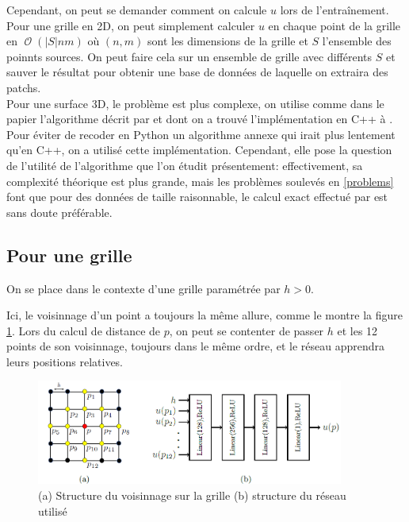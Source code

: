 \documentclass[11pt]{article} %
\DeclareMathOperator\Oo{\mathcal{O}}
\begin{document}
Cependant, on peut se demander comment on calcule $u$ lors de l'entraînement.\\
Pour une grille en 2D, on peut simplement calculer $u$ en chaque point de la grille en $\Oo(\vert S \vert nm)$ où $(n, m)$ sont les dimensions de la grille et $S$ l'ensemble des poinnts sources. On peut faire cela sur un ensemble de grille avec différents $S$ et sauver le résultat pour obtenir une base de données de laquelle on extraira des patchs.\\
Pour une surface 3D, le problème est plus complexe, on utilise comme dans le papier l'algorithme décrit par \cite{ExactGeodesics} et dont on a trouvé l'implémentation en C++ à \cite{ExactGeodesicsCode}. Pour éviter de recoder en Python un algorithme annexe qui irait plus lentement qu'en C++, on a utilisé cette implémentation. Cependant, elle pose la question de l'utilité de l'algorithme que l'on étudit présentement: effectivement, sa complexité théorique est plus grande, mais les problèmes soulevés en \ref{problems} font que pour des données de taille raisonnable, le calcul exact effectué par \cite{ExactGeodesicsCode} est sans doute préférable.

\subsection{Pour une grille}\label{grille}

On se place dans le contexte d'une grille paramétrée par $h > 0$.

Ici, le voisinnage d'un point a toujours la même allure, comme le montre la figure \ref{gridN}. Lors du calcul de distance de $p$, on peut se contenter de passer $h$ et les 12 points de son voisinnage, toujours dans le même ordre, et le réseau apprendra leurs positions relatives.

\begin{figure}[h]
\centering
\includegraphics[width=0.9\textwidth]{imgs/gridN}
\caption{(a) Structure du voisinnage sur la grille (b) structure du réseau utilisé}
\label{gridN}
\end{figure}
\end{document}
